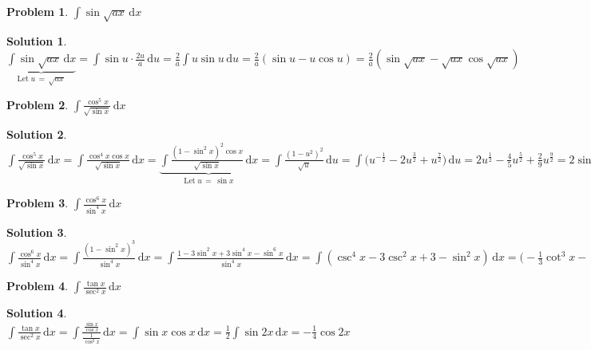 \documentclass[11pt,a4paper]{article}
\newcommand{\ds}{\displaystyle}
\theoremstyle{definition}
\newtheorem*{problem}{Problem}
\newtheorem*{solution}{Solution}
\begin{document}
\begin{problem}
  $\ds\int\!\sin\!\sqrt{a x}\,\text{d}x$
\end{problem}

\begin{solution}
  $\ds\underbrace{\int\!\sin\!\sqrt{a x}\,\text{d}x}_{\text{Let}\;u\,=\,\sqrt{a x}} = \int\!\sin u\cdot\frac{2u}{a}\,\text{d}u = \frac{2}{a}\int\!u\sin u\,\text{d}u = \frac{2}{a}(\sin u - u\cos u) = \frac{2}{a}(\sin\!\sqrt{ax} - \sqrt{ax}\cos\!\sqrt{ax})$
\end{solution}

\begin{problem}
  $\ds\int\!\frac{\cos^5\!x}{\sqrt{\sin x}}\,\text{d}x$
\end{problem}

\begin{solution}
  $\ds\int\!\frac{\cos^5\!x}{\sqrt{\sin x}}\,\text{d}x = \int\!\frac{\cos^4\!x\cos x}{\sqrt{\sin x}}\,\text{d}x = \underbrace{\int\!\frac{(1 - \sin^2\!x)^2\cos x}{\sqrt{\sin x}}\,\text{d}x}_{\text{Let}\;u\,=\,\sin x} = \int\!\frac{(1 - u^2)^2}{\sqrt{u}}\,\text{d}u = \int\!\big(u^{-\frac{1}{2}} - 2u^{\frac{3}{2}} + u^{\frac{7}{2}}\big)\,\text{d}u = 2u^{\frac{1}{2}} - \frac{4}{5}u^{\frac{5}{2}} + \frac{2}{9}u^{\frac{9}{2}} = 2\sin^{\frac{1}{2}}\!x - \frac{4}{5}\sin^{\frac{5}{2}}\!x + \frac{2}{9}\sin^{\frac{9}{2}}\!x$
\end{solution}

\begin{problem}
  $\ds\int\!\frac{\cos^6\!x}{\sin^4\!x}\,\text{d}x$
\end{problem}

\begin{solution}
  $\ds\int\!\frac{\cos^6\!x}{\sin^4\!x}\,\text{d}x = \int\!\frac{(1 - \sin^2\!x)^3}{\sin^4\!x}\,\text{d}x = \int\!\frac{1 - 3\sin^2\!x + 3\sin^4\!x - \sin^6\!x}{\sin^4\!x}\,\text{d}x = \int\!(\csc^4\!x - 3\csc^2\!x + 3 - \sin^2\!x)\,\text{d}x = \Big(-\frac{1}{3}\cot^3\!x - \cot x\Big) + 3\cot x + 3x - \Big(\frac{x}{2} - \frac{\sin\!2x}{4}\Big) = -\frac{1}{3}\cot^3\!x + 2\cot x + \frac{5x}{2} + \frac{\sin\!2x}{4} $
\end{solution}

\begin{problem}
  $\ds\int\!\frac{\tan x}{\sec^2\!x}\,\text{d}x$
\end{problem}

\begin{solution}
  $\ds\int\!\frac{\tan x}{\sec^2\!x}\,\text{d}x = \int\!\frac{\frac{\sin x}{\cos x}}{\frac{1}{\cos^2\!x}}\,\text{d}x = \int\!\sin x\cos x\,\text{d}x = \frac{1}{2}\int\!\sin 2x\,\text{d}x = -\frac{1}{4}\cos 2x$
\end{solution}
\end{document}
